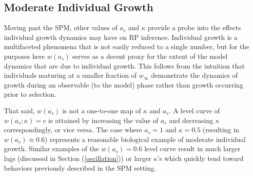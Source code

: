 %
\subsection{Moderate Individual Growth\label{medium}}

%
Moving past the SPM, other values of $a_s$ and $\kappa$ provide a probe into 
the effects individual growth dynamics may have on RP inference.
%
Individual growth is a multifaceted phenomena that is not easily reduced
to a single number, but for the purposes here $w(a_s)$ serves as a decent 
proxy for the extent of the model dynamics that are due to individual growth. %
%
This follows from the intuition that individuals maturing at a smaller fraction
of $w_\infty$ demonstrate the dynamics of growth during an observable (to the model) %
phase rather than growth occurring prior to selection. %

%
That said, $w(a_s)$ is not a one-to-one map of $\kappa$ and $a_s$.
%
A level curve of $w(a_s; \kappa)=c$ is attained by increasing the value of $a_s$
and decreasing $\kappa$ correspondingly, or vice versa.
%
The case where $a_s=1$ and $\kappa=0.5$ (resulting in $w(a_s)\approx0.6$)
represents a reasonable biological example of moderate individual growth.
%
Similar examples of the $w(a_s)=0.6$ level curve result in much larger lags
(discussed in Section (\ref{oscillation})) or larger $\kappa$'s which quickly
tend toward behaviors previously described in the SPM
setting.

